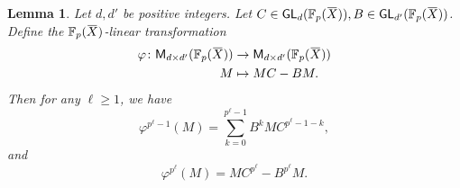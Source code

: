 \documentclass[letterpaper, 11pt, thm-restate]{article}
\numberwithin{equation}{section}
\newcommand{\F}{\mathbb{F}}
\newcommand{\GL}{\mathsf{GL}}
\newcommand{\M}{\mathsf{M}}
\newcommand{\oX}{\mkern 1.5mu\overline{\mkern-1.5mu X \mkern-1.5mu}\mkern 1.5mu}
\newtheorem{lem}[thrm]{Lemma}
\theoremstyle{definition}
\theoremstyle{definition}
\theoremstyle{definition}
\begin{document}
\begin{lem}\label{lem:iterphi}
    Let $d, d'$ be positive integers.
    Let $C \in \GL_{d}(\F_p(\oX)), B \in \GL_{d'}(\F_p(\oX))$. 
    Define the $\F_p(\oX)$-linear transformation
    \begin{align*}
        \varphi \colon \M_{d \times d'}(\F_p(\oX)) & \rightarrow \M_{d \times d'}(\F_p(\oX)) \\
        M & \mapsto M C - B M.
    \end{align*}
    Then for any $\ell \geq 1$, we have
    \begin{equation}\label{eq:iterpm1}
    \varphi^{p^\ell-1}(M) = \sum_{k=0}^{p^\ell-1} B^k M C^{p^\ell-1-k},
    \end{equation}
    and
    \begin{equation}\label{eq:iterpp}
    \varphi^{p^{\ell}}(M) = M C^{p^{\ell}} - B^{p^{\ell}} M.
    \end{equation}
\end{lem}
\end{document}
